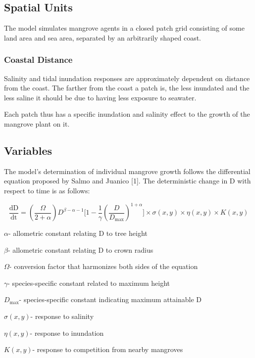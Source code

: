 \subsection{Spatial Units}

The model simulates mangrove agents in a closed patch grid consisting of
some land area and sea area, separated by an arbitrarily shaped coast.

\subsubsection{Coastal Distance}

Salinity and tidal inundation responses are approximately dependent on
distance from the coast. The farther from the coast a patch is, the less
inundated and the less saline it should be due to having less exposure
to seawater.

Each patch thus has a specific inundation and salinity effect to the
growth of the mangrove plant on it.

\subsection{Variables}

The model's determination of individual mangrove growth follows the
differential equation proposed by Salmo and Juanico {[}1{]}. The
deterministic change in D with respect to time is as follows:


\begin{dmath}
\frac{\text{dD}}{\text{dt}} = (\frac{\Omega}{2 + \alpha})D^{\beta - \alpha - 1}\lbrack 1 - \frac{1}{\gamma}{(\frac{D}{D_{\max}})}^{1 + \alpha}\rbrack \times \sigma(x,y) \times \eta(x,y) \times K(x,y)
\end{dmath}


\(\alpha\)- allometric constant relating D to tree height

\(\beta\)- allometric constant relating D to crown radius

\(\Omega\)- conversion factor that harmonizes both sides of the equation

\(\gamma\)- species-specific constant related to maximum height

\(D_{\max}\)- species-specific constant indicating maximum attainable D

\(\sigma(x,y)\)- response to salinity

\(\eta(x,y)\)- response to inundation

\(K(x,y)\)- response to competition from nearby mangroves

